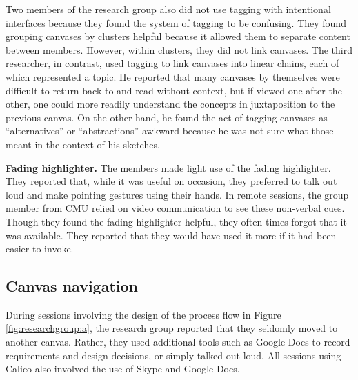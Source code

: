 Two members of the research group also did not use tagging with intentional interfaces because they found the system of tagging to be confusing. They found grouping canvases by clusters helpful because it allowed them to separate content between members. However, within clusters, they did not link canvases. The third researcher, in contrast, used tagging to link canvases into linear chains, each of which represented a topic. He reported that many canvases by themselves were difficult to return back to and read without context, but if viewed one after the other, one could more readily understand the concepts in juxtaposition to the previous canvas. On the other hand, he found the act of tagging canvases as ``alternatives'' or ``abstractions'' awkward because he was not sure what those meant in the context of his sketches.


\textbf{Fading highlighter.} The members made light use of the fading highlighter. They reported that, while it was useful on occasion, they preferred to talk out loud and make pointing gestures using their hands. In remote sessions, the group member from CMU relied on video communication to see these non-verbal cues. Though they found the fading highlighter helpful, they often times forgot that it was available. They reported that they would have used it more if it had been easier to invoke.

\subsection{Canvas navigation}

During sessions involving the design of the process flow in Figure \ref{fig:researchgroup:a}, the research group reported that they seldomly moved to another canvas. Rather, they used additional tools such as Google Docs to record requirements and design decisions, or simply talked out loud. All sessions using Calico also involved the use of Skype and Google Docs.

